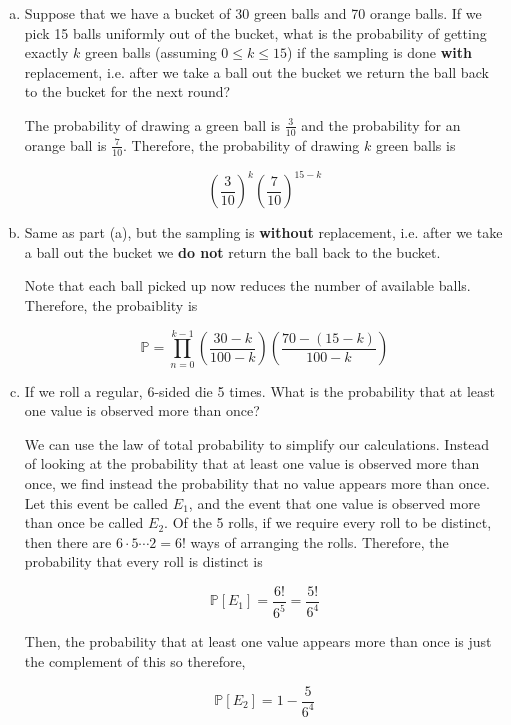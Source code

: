 \documentclass[11pt]{article}
\begin{document}
\begin{enumerate}[(a)]
\item Suppose that we have a bucket of 30 green balls and 70 orange balls. If we pick 15 balls uniformly out of the bucket, what is the probability of getting exactly $k$ green balls (assuming $0 \leq k \leq 15$) if the sampling is done {\bf with} replacement, i.e. after we take a ball out the bucket we return the ball back to the bucket for the next round?

\begin{solution}
  The probability of drawing a green ball is $\frac{3}{10}$ and the probability for an orange ball is $\frac{7}{10}$. Therefore, the probability of drawing $k$ green balls is 

  \[ \left(\frac{3}{10}\right)^k \left(\frac{7}{10}\right)^{15 - k}\]
\end{solution}
    

\item Same as part (a), but the sampling is {\bf without} replacement, i.e. after we take a ball out the bucket we {\bf do not} return the ball back to the bucket.

\begin{solution}
  Note that each ball picked up now reduces the number of available balls. Therefore, the probaiblity is 

  \[ \mathbb P = \prod_{n = 0}^{k-1} \left(\frac{30-k}{100-k}\right) \left(\frac{70 - (15 - k)}{100 - k}\right)\]
\end{solution}
    

\item If we roll a regular, 6-sided die 5 times. What is the probability that at least one value is observed more than once?

\begin{solution}
  We can use the law of total probability to simplify our calculations. Instead of looking at the probability that at least one value is observed more than once, we find instead the probability that no value appears more than once. Let this event be called $E_1$, and the event that one value is observed more than once be called $E_2$. Of the 5 rolls, if we require every roll to be distinct, then there are $6 \cdot 5 \cdots 2 = 6!$ ways of arranging the rolls. Therefore, the probability that every roll is distinct is 

  \[ \mathbb P[E_1] = \frac{6!}{6^5} = \frac{5!}{6^4}\]

  Then, the probability that at least one value appears more than once is just the complement of this so therefore, 

  \[ \mathbb P[E_2] = 1 - \frac{5}{6^4}\]
\end{solution}
    

\end{enumerate}
\end{document}
